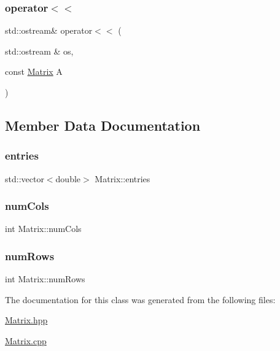 \subsubsection{\texorpdfstring{operator$<$$<$}{operator<<}}
{\footnotesize\ttfamily std\+::ostream\& operator$<$$<$ (\begin{DoxyParamCaption}\item[{std\+::ostream \&}]{os,  }\item[{const \mbox{\hyperlink{class_matrix}{Matrix}}}]{A }\end{DoxyParamCaption})\hspace{0.3cm}{\ttfamily [friend]}}



\subsection{Member Data Documentation}
\mbox{\label{class_matrix_aac8f997f1cfa7b0a0ed1d11b554a8c24}} 
\subsubsection{\texorpdfstring{entries}{entries}}
{\footnotesize\ttfamily std\+::vector$<$double$>$ Matrix\+::entries}

\mbox{\label{class_matrix_a1ddb385f8482c80f98e5cdbf914ba11a}} 
\subsubsection{\texorpdfstring{num\+Cols}{numCols}}
{\footnotesize\ttfamily int Matrix\+::num\+Cols}

\mbox{\label{class_matrix_a0eb658c64c749da9cc9705dc232fcb85}} 
\subsubsection{\texorpdfstring{num\+Rows}{numRows}}
{\footnotesize\ttfamily int Matrix\+::num\+Rows}



The documentation for this class was generated from the following files\+:\begin{DoxyCompactItemize}
\item 
\mbox{\hyperlink{_matrix_8hpp}{Matrix.\+hpp}}\item 
\mbox{\hyperlink{_matrix_8cpp}{Matrix.\+cpp}}\end{DoxyCompactItemize}
